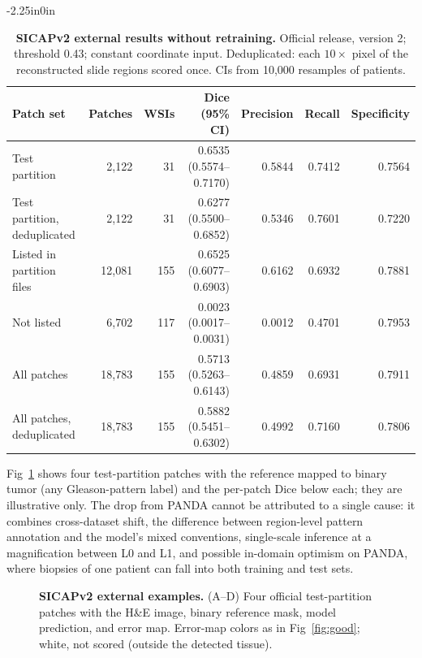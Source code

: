 \documentclass[10pt,letterpaper]{article}
\begin{document}
\begin{table}[H]\begin{adjustwidth}{-2.25in}{0in}\centering
\caption{\textbf{SICAPv2 external results without retraining.} Official release, version 2; threshold 0.43; constant coordinate input. Deduplicated: each $10\times$ pixel of the reconstructed slide regions scored once. CIs from 10,000 resamples of patients.}
\begin{tabular}{lrrrrrr}\toprule Patch set & Patches & WSIs & Dice (95\% CI) & Precision & Recall & Specificity\\\midrule
Test partition & 2,122 & 31 & 0.6535 (0.5574--0.7170) & 0.5844 & 0.7412 & 0.7564\\
Test partition, deduplicated & 2,122 & 31 & 0.6277 (0.5500--0.6852) & 0.5346 & 0.7601 & 0.7220\\
Listed in partition files & 12,081 & 155 & 0.6525 (0.6077--0.6903) & 0.6162 & 0.6932 & 0.7881\\
Not listed & 6,702 & 117 & 0.0023 (0.0017--0.0031) & 0.0012 & 0.4701 & 0.7953\\
All patches & 18,783 & 155 & 0.5713 (0.5263--0.6143) & 0.4859 & 0.6931 & 0.7911\\
All patches, deduplicated & 18,783 & 155 & 0.5882 (0.5451--0.6302) & 0.4992 & 0.7160 & 0.7806\\
\bottomrule
\end{tabular}\label{tab:sicap}\end{adjustwidth}\end{table}

Fig~\ref{fig:sicap} shows four test-partition patches with the reference mapped to binary tumor (any Gleason-pattern label) and the per-patch Dice below each; they are illustrative only. The drop from PANDA cannot be attributed to a single cause: it combines cross-dataset shift, the difference between region-level pattern annotation and the model's mixed conventions, single-scale inference at a magnification between L0 and L1, and possible in-domain optimism on PANDA, where biopsies of one patient can fall into both training and test sets.

\begin{figure}[H]
\centering
\caption{\textbf{SICAPv2 external examples.} (A--D) Four official test-partition patches with the H\&E image, binary reference mask, model prediction, and error map. Error-map colors as in Fig~\ref{fig:good}; white, not scored (outside the detected tissue).}
\label{fig:sicap}
\end{figure}
\end{document}
